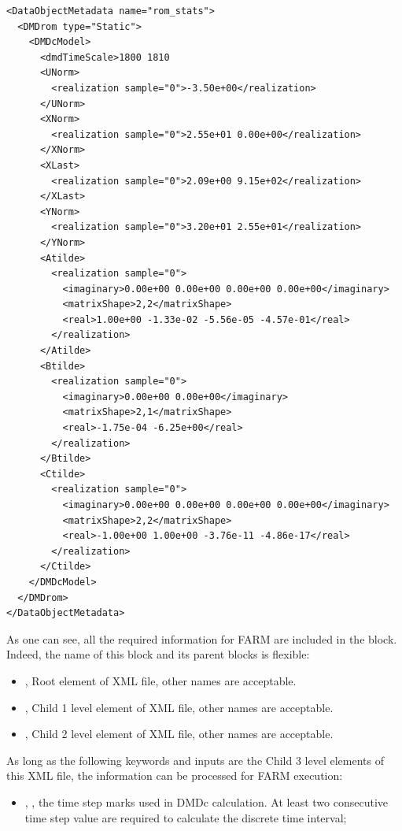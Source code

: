 \begin{lstlisting}[style=XML,morekeywords={anAttribute}, 
  caption=Unparameterized External Matrices File Example., label=lst:UnparaExtXMLExample]
<DataObjectMetadata name="rom_stats">
  <DMDrom type="Static">
    <DMDcModel>
      <dmdTimeScale>1800 1810
      <UNorm>
        <realization sample="0">-3.50e+00</realization>
      </UNorm>
      <XNorm>
        <realization sample="0">2.55e+01 0.00e+00</realization>
      </XNorm>
      <XLast>
        <realization sample="0">2.09e+00 9.15e+02</realization>
      </XLast>
      <YNorm>
        <realization sample="0">3.20e+01 2.55e+01</realization>
      </YNorm>
      <Atilde>
        <realization sample="0">
          <imaginary>0.00e+00 0.00e+00 0.00e+00 0.00e+00</imaginary>
          <matrixShape>2,2</matrixShape>
          <real>1.00e+00 -1.33e-02 -5.56e-05 -4.57e-01</real>
        </realization>
      </Atilde>
      <Btilde>
        <realization sample="0">
          <imaginary>0.00e+00 0.00e+00</imaginary>
          <matrixShape>2,1</matrixShape>
          <real>-1.75e-04 -6.25e+00</real>
        </realization>
      </Btilde>
      <Ctilde>
        <realization sample="0">
          <imaginary>0.00e+00 0.00e+00 0.00e+00 0.00e+00</imaginary>
          <matrixShape>2,2</matrixShape>
          <real>-1.00e+00 1.00e+00 -3.76e-11 -4.86e-17</real>
        </realization>
      </Ctilde>
    </DMDcModel>
  </DMDrom>
</DataObjectMetadata>
\end{lstlisting}

As one can see, all the required information for FARM are included in the  block. 
Indeed, the name of this block and its parent blocks is flexible:
\begin{itemize}
  \item {}, Root element of XML file, other names are acceptable.
  \item {}, Child 1 level element of XML file, other names are acceptable.
  \item {}, Child 2 level element of XML file, other names are acceptable.
\end{itemize}

As long as the following keywords and inputs are the Child 3 level elements of this XML file, the information can 
be processed for FARM execution:
\begin{itemize}
  \item {}, , 
  the time step marks used in DMDc calculation. 
  At least two consecutive time step value are required to calculate the discrete time interval;
\end{itemize}

